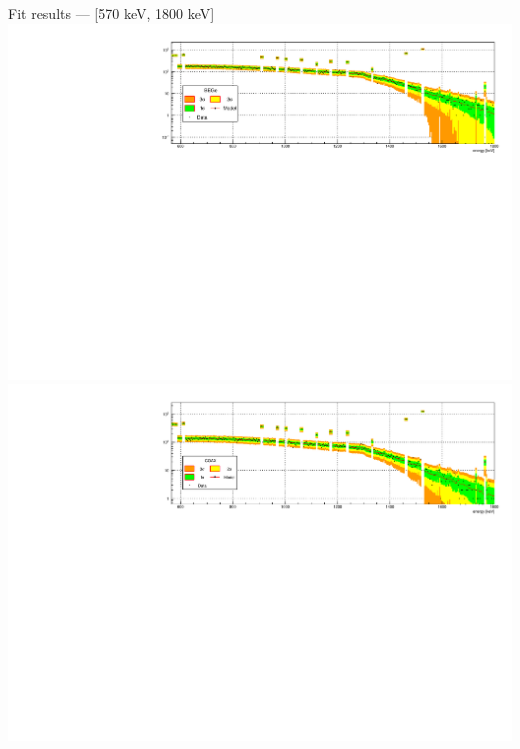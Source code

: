 \documentclass[10pt]{beamer}
\begin{document}
\begin{frame}{Fit results --- [570 keV, 1800 keV]}
	\centering\includegraphics[height=\textwidth, angle=270]{img/BEGe.pdf} \\
	\centering\includegraphics[height=\textwidth, angle=270]{img/COAX.pdf}
\end{frame}
\end{document}

